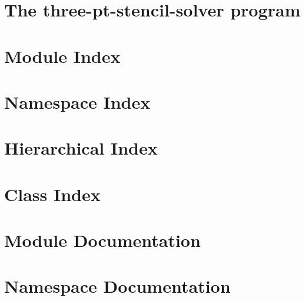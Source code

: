 \let\mypdfximage\pdfximage\def\pdfximage{\immediate\mypdfximage}\documentclass[twoside]{book}
\newcommand{\+}{\discretionary{\mbox{\scriptsize$\hookleftarrow$}}{}{}}
\begin{document}
\chapter{The three-\/pt-\/stencil-\/solver program}
\label{three_pt_stencil_solver}

\chapter{Module Index}

\chapter{Namespace Index}

\chapter{Hierarchical Index}

\chapter{Class Index}

\chapter{Module Documentation}















\chapter{Namespace Documentation}



















\end{document}
